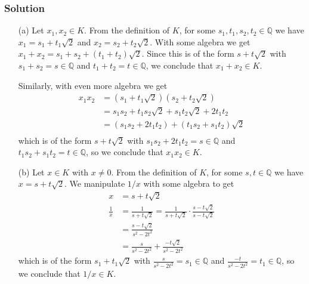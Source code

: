 \documentclass[12pt]{article}
\begin{document}
\subsubsection*{Solution}
\begin{itemize}
\item[(a)] Let $x_1, x_2 \in K$. From the definition of $K$, for some $s_1, t_1, s_2, t_2 \in \mathbb{Q}$ we have $x_1 = s_1 + t_1 \sqrt{2}$ and $x_2 = s_2 + t_2\sqrt{2}$. With some algebra we get $x_1 + x_2 = s_1 + s_2 + \left(t_1 + t_2\right)\sqrt{2}$. Since this is of the form $s + t\sqrt{2}$ with $s_1 + s_2 = s \in \mathbb{Q}$ and $t_1 + t_2 = t \in \mathbb{Q}$, we conclude that $x_1 + x_2 \in K$.

Similarly, with even more algebra we get
\begin{align*}
x_1x_2 &= \left(s_1 + t_1\sqrt{2}\right) \left(s_2 + t_2\sqrt{2}\right) \\
&= s_1s_2 + t_1s_2\sqrt{2} + s_1t_2\sqrt{2} + 2t_1t_2 \\
&= \left(s_1s_2 + 2t_1t_2\right) + \left(t_1s_2 + s_1t_2\right)\sqrt{2} \\
\end{align*}
which is of the form $s + t \sqrt{2}$ with $s_1s_2 + 2t_1t_2 = s \in \mathbb{Q}$ and $t_1s_2 + s_1t_2 = t \in \mathbb{Q}$, so we conclude that $x_1x_2 \in K$.
\item[(b)] Let $x \in K$ with $x \neq 0$. From the definition of $K$, for some $s, t \in \mathbb{Q}$ we have $x = s + t\sqrt{2}$. We manipulate $1/x$ with some algebra to get
\begin{align*}
x &= s + t\sqrt{2} \\
\frac{1}{x} &= \frac{1}{s + t\sqrt{2}} = \frac{1}{s + t\sqrt{2}} \cdot \frac{s - t\sqrt{2}}{s - t\sqrt{2}} \\ 
&= \frac{s - t\sqrt{2}}{s^2 -2t^2} \\
&= \frac{s}{s^2 - 2t^2} + \frac{-t\sqrt{2}}{s^2 - 2t^2}
\end{align*}
which is of the form $s_1 + t_1\sqrt{2}$ with $\frac{s}{s^2 - 2t^2} = s_1 \in \mathbb{Q}$ and $\frac{-t}{s^2 - 2t^2} = t_1 \in \mathbb{Q}$, so we conclude that $1/x \in K$.
\end{itemize}
\end{document}
